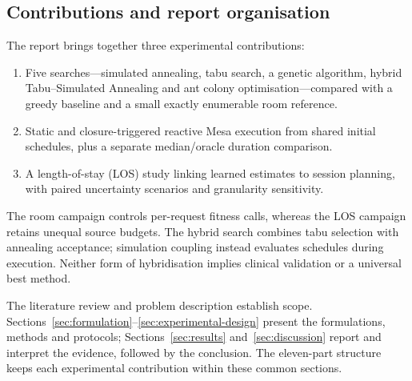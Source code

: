 \subsection{Contributions and report organisation}

The report brings together three experimental contributions:
\begin{enumerate}
\item Five searches---simulated annealing, tabu search, a genetic algorithm,
      hybrid Tabu--Simulated Annealing and ant colony optimisation---compared
      with a greedy baseline and a small exactly enumerable room reference.
\item Static and closure-triggered reactive Mesa execution from shared
      initial schedules, plus a separate median/oracle duration comparison.
\item A length-of-stay (LOS) study linking learned estimates to session
      planning, with paired uncertainty scenarios and granularity sensitivity.
\end{enumerate}
The room campaign controls per-request fitness calls, whereas the LOS
campaign retains unequal source budgets. The hybrid search combines tabu
selection with annealing acceptance; simulation coupling instead evaluates
schedules during execution. Neither form of hybridisation implies clinical
validation or a universal best method.

The literature review and problem description establish scope.
Sections~\ref{sec:formulation}--\ref{sec:experimental-design} present the
formulations, methods and protocols; Sections~\ref{sec:results}
and~\ref{sec:discussion} report and interpret the evidence, followed by the
conclusion. The eleven-part structure keeps each experimental contribution
within these common sections.
